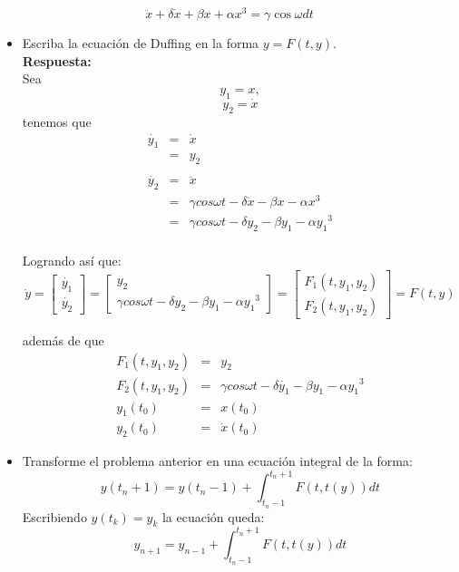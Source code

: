 \documentclass[letter, 10pt]{article}
\begin{document}
$$
	\ddot{x} + \delta \dot{x} + \beta x+ \alpha x^3 = \gamma \cos \omega dt
$$
\begin{itemize}
	\item Escriba la ecuación de Duffing en la forma $y = F (t, y)$.\\
	\textbf{Respuesta:}\\

	Sea  
	$$y_1 = x,$$
	$$y_2 = \dot{x}$$
	tenemos que 
	\begin{eqnarray}
	\dot{y_1} & = & \dot{x} \nonumber \\
	& = & y_2 \nonumber \\ \nonumber \\
	\dot{y_2} & = & \ddot{x} \nonumber \\
	& = & \gamma cos \omega t - \delta \dot{x} - \beta x - \alpha x^3 \nonumber \\
	& = & \gamma cos \omega t - \delta y_2 - \beta y_1 - \alpha {y_1}^3 \nonumber \\
	\nonumber
	\end{eqnarray}

Logrando así que:\\
$$
	\dot{y} = \begin{bmatrix} \dot{y_1} \\ \dot{y_2} \end{bmatrix} = \begin{bmatrix} y_2 \\ \gamma cos \omega t - \delta y_2 - \beta y_1 - \alpha {y_1}^3 \end{bmatrix} = \begin{bmatrix} F_1(t, y_1, y_2) \\ F_2(t, y_1, y_2) \end{bmatrix} = F(t,y) \nonumber
$$

además de que 
\begin{eqnarray}
	F_1(t, y_1, y_2) &=& y_2 \nonumber \\
	F_2(t, y_1, y_2) &=& \gamma cos \omega t - \delta \dot{y_1} - \beta y_1 - \alpha {y_1}^3 \nonumber \\
	y_1(t_0) &=& x(t_0) \nonumber \\
	y_2(t_0) &=& \dot{x}(t_0) \nonumber 
\end{eqnarray}

	\item Transforme el problema anterior en una ecuación integral de la forma:
$$
	y(t_n +1) = y(t_n - 1) + \int_{t_n-1}^{t_n+1} F(t, t(y))dt
$$
Escribiendo $y(t_k ) = y_k$ la ecuación queda:
$$
	y_{n+1} = y_{n-1} + \int_{t_n - 1}^{t_n +1} F(t,t(y))dt
$$
\end{itemize}
\end{document}
